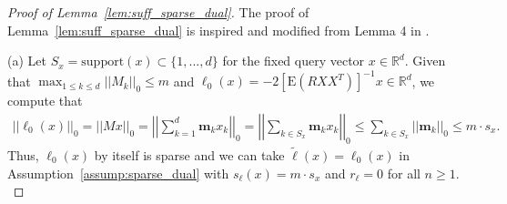 \documentclass[ejsv2,noshowframe]{imsart}
\theoremstyle{plain}
\theoremstyle{definition}
\theoremstyle{remark}
\newcommand{\norm}[1]{\left|\left| #1 \right|\right|}
\renewcommand{\tilde}{\widetilde}
\begin{document}
\begin{proof}[Proof of Lemma~\ref{lem:suff_sparse_dual}]
	The proof of Lemma~\ref{lem:suff_sparse_dual} is inspired and modified from Lemma 4 in \cite{giessing2021inference}.
	
	\noindent (a) Let $S_x=\mathrm{support}(x) \subset \{1,...,d\}$ for the fixed query vector $x\in \mathbb{R}^d$. Given that $\max_{1\leq k \leq d} \norm{M_k}_0 \leq m$ and $\ell_0(x) = -2\left[\mathrm{E}\left(RXX^T\right)\right]^{-1}x \in \mathbb{R}^d$, we compute that
	\begin{align*}
		\norm{\ell_0(x)}_0 = \norm{Mx}_0=\norm{\sum_{k=1}^d \bm{m}_kx_k}_0 = \norm{\sum_{k\in S_x} \bm{m}_k x_k}_0 \leq \sum_{k\in S_x} \norm{\bm{m}_k}_0 \leq m\cdot s_x. 
	\end{align*}
	Thus, $\ell_0(x)$ by itself is sparse and we can take $\tilde{\ell}(x)=\ell_0(x)$ in Assumption~\ref{assump:sparse_dual} with $s_{\ell}(x)=m\cdot s_x$ and $r_{\ell}=0$ for all $n\geq 1$.\\
	

\end{proof}
\end{document}
